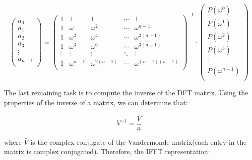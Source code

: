 \documentclass[letterpaper]{article}
\begin{document}
$$
 \begin{pmatrix}
 a_{0} \\
 a_{1} \\
 a_{2} \\
 a_{3} \\
 \vdots \\
 a_{n - 1} \\
 \end{pmatrix}
 =
  \begin{pmatrix}
   1 & 1 & 1 &\cdots & 1 \\
   1 & \omega & \omega^2 &\cdots & \omega^{n - 1} \\
   1 & \omega^2 & \omega^4 &\cdots & \omega^{2(n - 1)} \\
   1 & \omega^3 & \omega^6 &\cdots & \omega^{3(n - 1)} \\
   \vdots  & \vdots  & \vdots & \ddots  & \vdots \\
   1 & \omega^{n-1} & \omega^{2(n - 1)} &\cdots & \omega^{(n-1)(n-1)} \\
 \end{pmatrix} ^{-1}
 \cdot
 \begin{pmatrix}
 P(\omega^0) \\
 P(\omega^1) \\
 P(\omega^2) \\
 P(\omega^3) \\
 \vdots \\
 P(\omega^{n - 1}) \\
 \end{pmatrix}
$$

The last remaining task is to compute the inverse of the DFT matrix. Using the properties of the inverse of a matrix, we can determine that:

$$
V^{-1} = \frac{\bar{V}}{n}
$$

where $\bar{V}$ is the complex conjugate of the Vandermonde matrix(each entry in the matrix is complex conjugated). Therefore, the IFFT representation:
\end{document}
